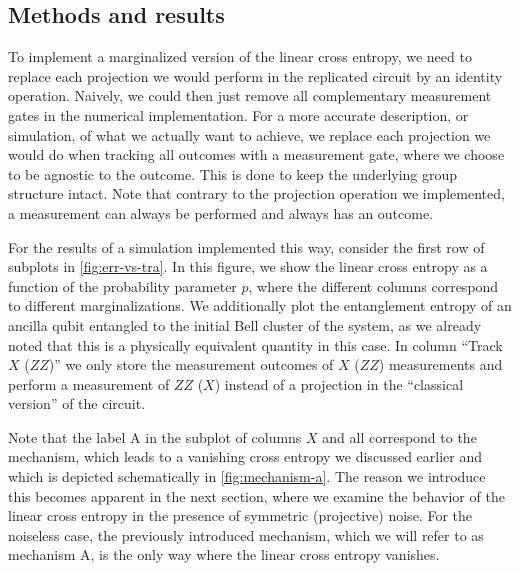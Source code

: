 
\subsection{Methods and results}

To implement a marginalized version of the linear cross entropy, we need to
replace each projection we would perform in the replicated circuit by an
identity operation. Naively, we could then just remove all complementary
measurement gates in the numerical implementation. For a more accurate
description, or simulation, of what we actually want to achieve, we replace
each projection we would do when tracking all outcomes with a measurement gate,
where we choose to be agnostic to the outcome. This is done to keep the
underlying group structure intact. Note that contrary to the projection
operation we implemented, a measurement can always be performed and always has
an outcome.

For the results of a simulation implemented this way, consider the first row of subplots in
\cref{fig:err-vs-tra}. In this figure, we show the linear cross entropy as a
function of the probability parameter $p$, where the different columns
correspond to different marginalizations. We additionally plot the entanglement
entropy of an ancilla qubit entangled to the initial Bell cluster of the
system, as we already noted that this is a physically equivalent quantity in
this case.
In column \enquote{Track $X$ ($ZZ$)}
we only store the measurement outcomes of $X$ ($ZZ$) measurements and perform a
measurement of $ZZ$ ($X$) instead of a projection in the \enquote{classical
version} of the circuit. 

Note that the label \textsf{A} in the subplot of
columns $X$ and all correspond to the mechanism, which leads to a vanishing
cross entropy we discussed earlier and which is depicted schematically in
\cref{fig:mechanism-a}. The reason we introduce this becomes apparent in the
next section, where we examine the behavior of the linear cross entropy in the
presence of symmetric (projective) noise. For the noiseless case, the
previously introduced mechanism, which we will refer to as mechanism
\textsf{A}, is the only way where the linear cross entropy vanishes.


